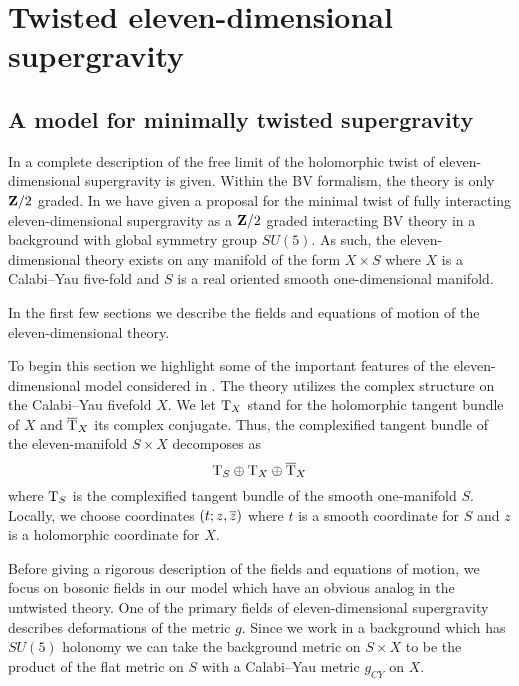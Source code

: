 

%

\section{Twisted eleven-dimensional supergravity}
%
\subsection{A model for minimally twisted supergravity}

In \cite{SWspinor} a complete description of the free limit of the holomorphic twist of eleven-dimensional supergravity is given.
Within the BV formalism, the theory is only $\mathbf{Z}/2$ graded.
In \cite{RSW} we have given a proposal for the minimal twist of fully interacting eleven-dimensional supergravity as a $\mathbf{Z}/2$ graded interacting BV theory in a background with global symmetry group $SU(5)$.
As such, the eleven-dimensional theory exists on any manifold of the form $X \times S$ where $X$ is a Calabi--Yau five-fold and $S$ is a real oriented smooth one-dimensional manifold.

In the first few sections we describe the fields and equations of motion of the eleven-dimensional theory. 

%

\parsec[s:sugrafields]

To begin this section we highlight some of the important features of the eleven-dimensional model considered in \cite{RSW}. 
The theory utilizes the complex structure on the Calabi--Yau fivefold $X$.
We let ${\rm T}_X$ stand for the holomorphic tangent bundle of $X$ and $\overline{{\rm T}}_X$ its complex conjugate.
Thus, the complexified tangent bundle of the eleven-manifold $S \times X$ decomposes as
\[
{\rm T}_S \oplus {\rm T}_X \oplus \overline{{\rm T}}_X 
\]
where ${\rm T}_S$ is the complexified tangent bundle of the smooth one-manifold $S$.
Locally, we choose coordinates $(t;z,\overline{z})$ where $t$ is a smooth coordinate for $S$ and $z$ is a holomorphic coordinate for $X$. 

Before giving a rigorous description of the fields and equations of motion, we focus on bosonic fields in our model which have an obvious analog in the untwisted theory. 
One of the primary fields of eleven-dimensional supergravity describes deformations of the metric $g$.
Since we work in a background which has $SU(5)$ holonomy we can take the background metric on $S \times X$ to be the product of the flat metric on $S$ with a Calabi--Yau metric $g_{CY}$ on $X$. 

